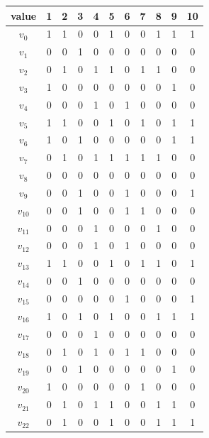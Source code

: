 \documentclass{article}
\begin{document}
    \begin{table}[htb!]
    \small
    \begin{minipage}{0.475\linewidth}
    \begin{tabular}{c | c c c c c c c c c c}
        \hline
        value & 1 & 2 & 3 & 4 & 5 & 6 & 7 & 8 & 9 & 10 \\
        \hline
        $v_0$ & 1 & 1 & 0 & 0 & 1 & 0 & 0 & 1 & 1 & 1 \\
        $v_1$ & 0 & 0 & 1 & 0 & 0 & 0 & 0 & 0 & 0 & 0 \\
        $v_2$ & 0 & 1 & 0 & 1 & 1 & 0 & 1 & 1 & 0 & 0 \\
        $v_3$ & 1 & 0 & 0 & 0 & 0 & 0 & 0 & 0 & 1 & 0 \\
        $v_4$ & 0 & 0 & 0 & 1 & 0 & 1 & 0 & 0 & 0 & 0 \\
        $v_5$ & 1 & 1 & 0 & 0 & 1 & 0 & 1 & 0 & 1 & 1 \\
        $v_6$ & 1 & 0 & 1 & 0 & 0 & 0 & 0 & 0 & 1 & 1 \\
        $v_7$ & 0 & 1 & 0 & 1 & 1 & 1 & 1 & 1 & 0 & 0 \\
        $v_8$ & 0 & 0 & 0 & 0 & 0 & 0 & 0 & 0 & 0 & 0 \\
        $v_9$ & 0 & 0 & 1 & 0 & 0 & 1 & 0 & 0 & 0 & 1 \\
        $v_{10}$ & 0 & 0 & 1 & 0 & 0 & 1 & 1 & 0 & 0 & 0 \\
        $v_{11}$ & 0 & 0 & 0 & 1 & 0 & 0 & 0 & 1 & 0 & 0 \\
        $v_{12}$ & 0 & 0 & 0 & 1 & 0 & 1 & 0 & 0 & 0 & 0 \\
        $v_{13}$ & 1 & 1 & 0 & 0 & 1 & 0 & 1 & 1 & 0 & 1 \\
        $v_{14}$ & 0 & 0 & 1 & 0 & 0 & 0 & 0 & 0 & 0 & 0 \\
        $v_{15}$ & 0 & 0 & 0 & 0 & 0 & 1 & 0 & 0 & 0 & 1 \\
        $v_{16}$ & 1 & 0 & 1 & 0 & 1 & 0 & 0 & 1 & 1 & 1 \\
        $v_{17}$ & 0 & 0 & 0 & 1 & 0 & 0 & 0 & 0 & 0 & 0 \\
        $v_{18}$ & 0 & 1 & 0 & 1 & 0 & 1 & 1 & 0 & 0 & 0 \\
        $v_{19}$ & 0 & 0 & 1 & 0 & 0 & 0 & 0 & 0 & 1 & 0 \\
        $v_{20}$ & 1 & 0 & 0 & 0 & 0 & 0 & 1 & 0 & 0 & 0 \\
        $v_{21}$ & 0 & 1 & 0 & 1 & 1 & 0 & 0 & 1 & 1 & 0 \\
        $v_{22}$ & 0 & 1 & 0 & 0 & 1 & 0 & 0 & 1 & 1 & 1 \\

\end{tabular}
\end{minipage}
\end{table}
\end{document}
